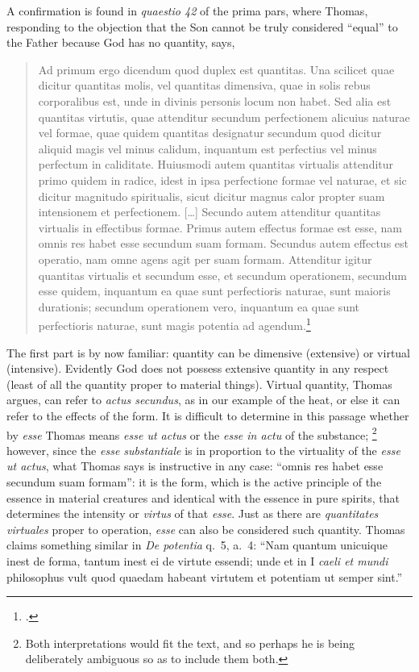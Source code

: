 A confirmation is found in \emph{quaestio 42} of the prima pars, where Thomas, responding to the objection that the Son cannot be truly considered “equal” to the Father because God has no quantity, says,
%
\begin{quotation}
Ad primum ergo dicendum quod duplex est quantitas. Una scilicet quae dicitur quantitas molis, vel quantitas dimensiva, quae in solis rebus corporalibus est, unde in divinis personis locum non habet. Sed alia est quantitas virtutis, quae attenditur secundum perfectionem alicuius naturae vel formae, quae quidem quantitas designatur secundum quod dicitur aliquid magis vel minus calidum, inquantum est perfectius vel minus perfectum in caliditate. Huiusmodi autem quantitas virtualis attenditur primo quidem in radice, idest in ipsa perfectione formae vel naturae, et sic dicitur magnitudo spiritualis, sicut dicitur magnus calor propter suam intensionem et perfectionem. [\ldots] Secundo autem attenditur quantitas virtualis in effectibus formae. Primus autem effectus formae est esse, nam omnis res habet esse secundum suam formam. Secundus autem effectus est operatio, nam omne agens agit per suam formam. Attenditur igitur quantitas virtualis et secundum esse, et secundum operationem, secundum esse quidem, inquantum ea quae sunt perfectioris naturae, sunt maioris durationis; secundum operationem vero, inquantum ea quae sunt perfectioris naturae, sunt magis potentia ad agendum.\footcite[I, q.~42, a.~1, ad 1]{st:summa}
\end{quotation}
%
The first part is by now familiar: quantity can be dimensive (extensive) or virtual (intensive). Evidently God does not possess extensive quantity in any respect (least of all the quantity proper to material things). Virtual quantity, Thomas argues, can refer to \emph{actus secundus}, as in our example of the heat, or else it can refer to the effects of the form. It is difficult to determine in this passage whether by \emph{esse}  Thomas means \emph{esse ut actus} or the \emph{esse in actu} of the substance;%
%
\footnote{Both interpretations would fit the text, and so perhaps he is being deliberately ambiguous so as to include them both.}
%
however, since the \emph{esse substantiale} is in proportion to the virtuality of the \emph{esse ut actus}, what Thomas says is instructive in any case: “omnis res habet esse secundum suam formam”: it is the form, which is the active principle of the essence in material creatures and identical with the essence in pure spirits, that determines the intensity or \emph{virtus} of that \emph{esse}. Just as there are \emph{quantitates virtuales} proper to operation, \emph{esse} can also be considered such quantity. Thomas claims something similar in \emph{De potentia} q.~5, a.~4: “Nam quantum unicuique inest de forma, tantum inest ei de virtute essendi; unde et in I \emph{caeli et mundi} philosophus vult quod quaedam habeant virtutem et potentiam ut semper sint.”\,%
